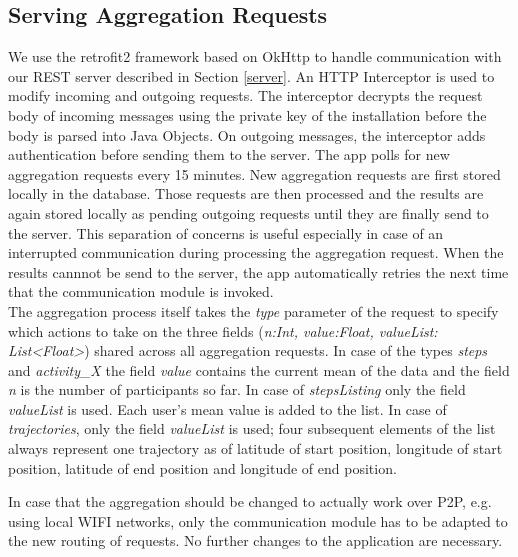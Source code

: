 \subsection{Serving Aggregation Requests}
We use the retrofit2 framework \parencite{retrofit} based on OkHttp \parencite{okhttp} to handle communication with our REST server described in Section \ref{server}. An HTTP Interceptor is used to modify incoming and outgoing requests. The interceptor decrypts the request body of incoming messages using the private key of the installation before the body is parsed into Java Objects. On outgoing messages, the interceptor adds authentication before sending them to the server.
The app polls for new aggregation requests every 15 minutes. New aggregation requests are first stored locally in the database. Those requests are then processed and the results are again stored locally as pending outgoing requests until they are finally send to the server. This separation of concerns is useful especially in case of an interrupted communication during processing the aggregation request. When the results cannnot be send to the server, the app automatically retries the next time that the communication module is invoked.\\
The aggregation process itself takes the \textit{type} parameter of the request to specify which actions to take on the three fields (\textit{n:Int, value:Float, valueList: List<Float>}) shared across all aggregation requests. In case of the types \textit{steps} and \textit{activity\_X} the field \textit{value} contains the current mean of the data and the field \textit{n} is the number of participants so far. In case of \textit{stepsListing} only the field \textit{valueList} is used. Each user's mean value is added to the list. In case of \textit{trajectories}, only the field \textit{valueList} is used; four subsequent elements of the list always represent one trajectory as of latitude of start position, longitude of start position, latitude of end position and longitude of end position.

In case that the aggregation should be changed to actually work over P2P, e.g. using local WIFI networks, only the communication module has to be adapted to the new routing of requests. No further changes to the application are necessary.


